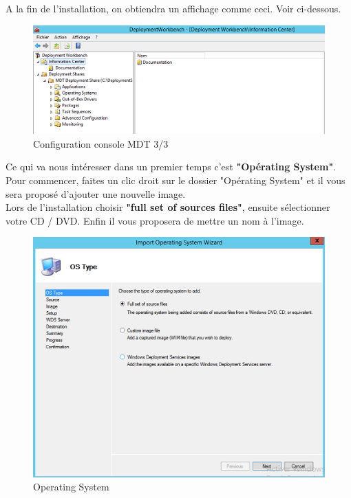 \documentclass[11pt,a4paper,oneside]{article}
\begin{document}
\newpage
A la fin de l'installation, on obtiendra un affichage comme ceci. Voir ci-dessous.
\begin{figure}[hbtp]
\centering
\includegraphics[scale=0.7]{Pictures/MDT/MDT5.png}
\caption{\label{etiquette} Configuration console MDT 3/3}
\end{figure}

Ce qui va nous intéresser dans un premier temps c'est \textbf{"Opérating System"}. Pour commencer, faites un clic droit sur le dossier "Opérating System" et il vous sera proposé d'ajouter une nouvelle image.\\
Lors de l'installation choisir \textbf{"full set of sources files"}, ensuite sélectionner votre CD / DVD. Enfin il vous proposera de mettre un nom à l'image.
\begin{figure}[hbtp]
\centering
\includegraphics[scale=0.7]{Pictures/MDT/MDT6.png}
\caption{\label{etiquette} Operating System}
\end{figure}
\end{document}

